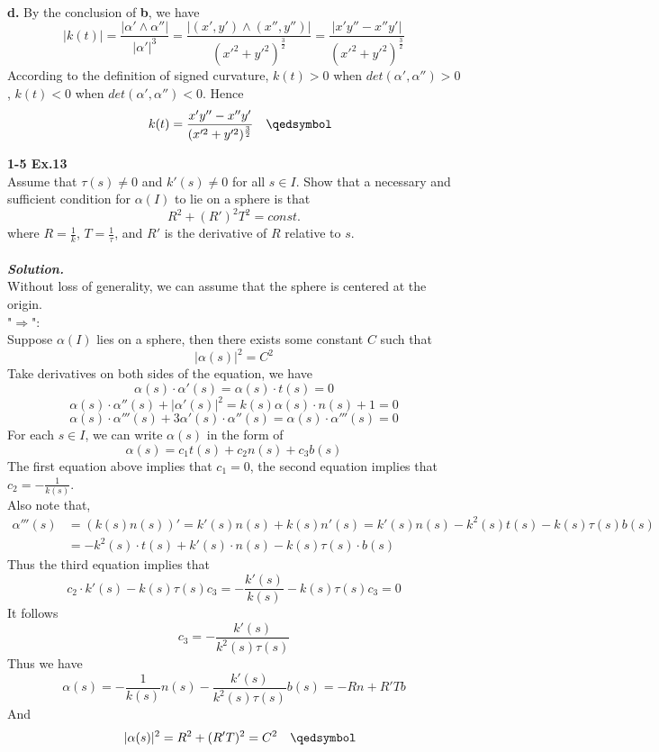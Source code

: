 \documentclass{article}
\begin{document}
\\
\textbf{d. }By the conclusion of \textbf{b}, we have
$$
    |k(t)| = \frac{|\alpha' \wedge \alpha''|}{|\alpha'|^3}
    = \frac{|(x', y') \wedge (x'', y'')|}{(x'^2+y'^2)^{\frac{3}{2}}} = \frac{|x'y''-x''y'|}{(x'^2+y'^2)^{\frac{3}{2}}}
$$
According to the definition of signed curvature, $k(t)>0$ when $det(\alpha', \alpha'')>0$, $k(t)<0$ when
$det(\alpha', \alpha'')<0$. Hence
$$
    \quad k(t) = \frac{x'y''-x''y'}{(x'^2+y'^2)^{\frac{3}{2}}} \quad \qedsymbol
$$

\par
\textbf{1-5 Ex.13}\\
Assume that $\tau(s) \neq 0$ and $k'(s) \neq 0$ for all $s \in I$. Show that a necessary and sufficient
condition for $\alpha(I)$ to lie on a sphere is that
$$
    R^2 + (R')^2T^2 = const.
$$
where $R = \frac{1}{k}$, $T = \frac{1}{\tau}$, and $R'$ is the derivative of $R$ relative to $s$.
\\\\
\textbf{\textit{Solution.}}\\
Without loss of generality, we can assume that the sphere is centered at the origin.\\
"$\Rightarrow$":\\
Suppose $\alpha(I)$ lies on a sphere, then there exists some constant $C$ such that
$$
    |\alpha(s)|^2 = C^2
$$
Take derivatives on both sides of the equation, we have
$$
    \alpha(s) \cdot \alpha'(s) = \alpha(s) \cdot t(s) = 0
$$
$$
    \alpha(s) \cdot \alpha''(s) + |\alpha'(s)|^2 = k(s) \alpha(s) \cdot n(s) + 1 = 0
$$
$$
    \alpha(s) \cdot \alpha'''(s) + 3\alpha'(s) \cdot \alpha''(s) = \alpha(s) \cdot \alpha'''(s) = 0
$$
For each $s \in I$, we can write $\alpha(s)$ in the form of
$$
    \alpha(s) = c_1t(s) + c_2n(s) + c_3b(s)
$$
The first equation above implies that $c_1=0$, the second equation implies that $c_2 = -\frac{1}{k(s)}$.\\
Also note that,
$$
\begin{aligned}
    \alpha'''(s) &= (k(s)n(s))' = k'(s)n(s) + k(s)n'(s) = k'(s)n(s) - k^2(s)t(s) - k(s)\tau(s)b(s)\\
    &= -k^2(s) \cdot t(s) + k'(s) \cdot n(s) - k(s)\tau(s) \cdot b(s)
\end{aligned}
$$
Thus the third equation implies that
$$
    c_2 \cdot k'(s) - k(s)\tau(s)c_3 = -\frac{k'(s)}{k(s)} - k(s)\tau(s)c_3 = 0
$$
It follows
$$
    c_3 = -\frac{k'(s)}{k^2(s)\tau(s)}
$$
Thus we have
$$
    \alpha(s) = -\frac{1}{k(s)}n(s) - \frac{k'(s)}{k^2(s)\tau(s)}b(s) = -Rn + R'Tb
$$
And
$$
    \quad |\alpha(s)|^2 = R^2 + (R'T)^2 = C^2 \quad \qedsymbol
$$
\end{document}
